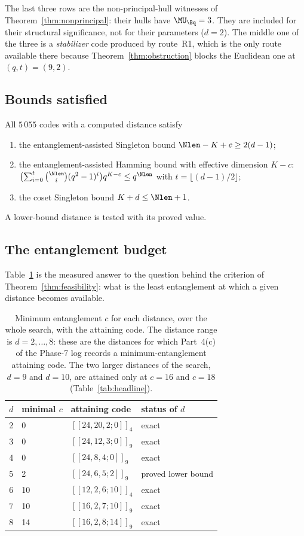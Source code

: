 The last three rows are the non-principal-hull witnesses of
Theorem~\ref{thm:nonprincipal}: their hulls have $\MU_{\Bq}=3$. They are
included for their structural significance, not for their parameters
($d=2$). The middle one of the three is a \emph{stabilizer} code produced by
route~R1, which is the only route available there because
Theorem~\ref{thm:obstruction} blocks the Euclidean one at $(q,t)=(9,2)$.

\subsection{Bounds satisfied}

\begin{proposition}[bounds]\label{prop:bounds}
All $5\,055$ codes with a computed distance satisfy
\begin{enumerate}[label=\textnormal{(\alph*)},leftmargin=*]
\item the entanglement-assisted Singleton bound $\Nlen-K+c\ge2(d-1)$;
\item the entanglement-assisted Hamming bound with effective dimension $K-c$:
  $\bigl(\sum_{i=0}^{t}\binom{\Nlen}{i}(q^2-1)^i\bigr)q^{K-c}\le q^{\Nlen}$
  with $t=\lfloor(d-1)/2\rfloor$;
\item the coset Singleton bound $K+d\le\Nlen+1$.
\end{enumerate}
A lower-bound distance is tested with its proved value.
\end{proposition}

\subsection{The entanglement budget}

Table~\ref{tab:budget} is the measured answer to the question behind the
criterion of Theorem~\ref{thm:feasibility}: what is the least entanglement at
which a given distance becomes available.

\begin{table}[t]
\centering
\caption{Minimum entanglement $c$ for each distance, over the whole search,
with the attaining code. The distance range is $d=2,\dots,8$: these are the
distances for which Part~4(c) of the Phase-7 log records a minimum-entanglement
attaining code. The two larger distances of the search, $d=9$ and $d=10$, are
attained only at $c=16$ and $c=18$ (Table~\ref{tab:headline}).}
\label{tab:budget}
\begin{tabular}{@{}clll@{}}
\toprule
$d$ & minimal $c$ & attaining code & status of $d$\\
\midrule
2 & 0  & $[[24,20,2;0]]_4$  & exact\\
3 & 0  & $[[24,12,3;0]]_9$  & exact\\
4 & 0  & $[[24,8,4;0]]_9$   & exact\\
5 & 2  & $[[24,6,5;2]]_9$   & proved lower bound\\
6 & 10 & $[[12,2,6;10]]_4$  & exact\\
7 & 10 & $[[16,2,7;10]]_9$  & exact\\
8 & 14 & $[[16,2,8;14]]_9$  & exact\\
\bottomrule
\end{tabular}
\end{table}

